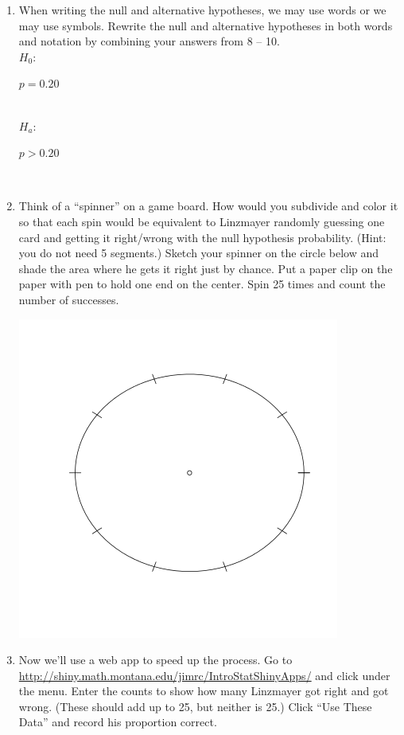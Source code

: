 \begin{enumerate}
   \item \label{ESP-hyps} When writing the null and alternative
     hypotheses, we may use words or we may use symbols.  Rewrite the
     null and alternative hypotheses in both words and notation by
     combining your answers
     from 8 -- 10.\\
     $H_0$:
\begin{students}
  \vspace{1.2cm}
\end{students}
\begin{key}
{\it $p = 0.20$}
\end{key}
\\
     $H_a$:
\begin{students}
  \vspace{1.2cm}
\end{students}
\begin{key}
{\it $p > 0.20$}
\end{key}
\\
     \item Think of a ``spinner'' on a game board. How would you
       subdivide and color it so that each spin would be equivalent to
       Linzmayer randomly guessing one card and getting it right/wrong
       with the null hypothesis probability.  (Hint: you do not need 5
       segments.) Sketch your spinner on the circle below and shade the area
       where he gets it right just by chance. Put a paper clip on the
       paper with pen to hold one end on the center.  Spin 25 times
       and count the number of successes.

       \includegraphics[width=.3\linewidth]{../../plots/spinnerCircle.png}
\vspace{-1cm}

  \item Now we'll use a web app to speed up the process.  Go to
     \url{http://shiny.math.montana.edu/jimrc/IntroStatShinyApps/} and click
        under the  menu.
       Enter the counts to show how many Linzmayer got right and got
       wrong. (These should add up to 25, but neither is 25.)
       Click ``Use These Data'' and record his proportion correct.


\end{enumerate}
